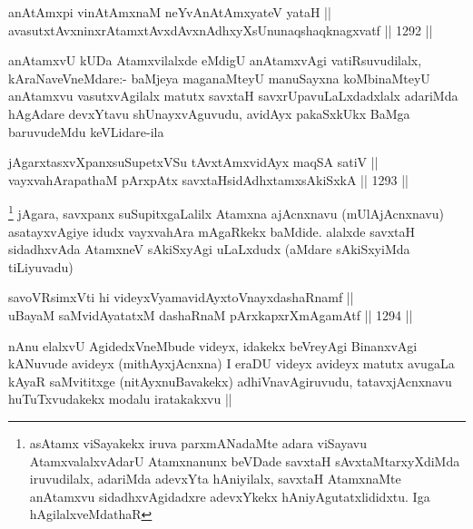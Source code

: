 
\begin{shl}
anAtAmx\s pi vinA\s \s tAmxnaM neYvAnAtAmxyateV yataH || \\
avasutxtAvxninxrAtamxtAvxdAvxnAdhxyXsUnunaqshaqknagxvatf ||  1292 ||  
\end{shl}

\begin{artha}
anAtamxvU kUDa Atamxvilalxde eMdigU anAtamxvAgi vatiRsuvudilalx, kAraNaveVneMdare:- baMjeya maganaMteyU manuSayxna koMbinaMteyU anAtamxvu vasutxvAgilalx matutx savxtaH savxrUpavuLaLxdadxlalx adariMda hAgAdare devxYtavu shUnayxvAguvudu, avidAyx pakaSxkUkx BaMga baruvudeMdu keVLidare-ila
\end{artha}


\begin{shl}
jAgarxtasxvXpanxsuSupetxVSu tAvxtAmxvidAyx maqSA satiV || \\
vayxvahArapathaM pArxpAtx savxtaHsidAdhxtamxsAkiSxkA ||  1293 ||  
\end{shl}

\begin{artha}
\footnote{asAtamx viSayakekx iruva parxmANadaMte adara viSayavu AtamxvalalxvAdarU Atamxnanunx beVDade savxtaH sAvxtaMtarxyXdiMda iruvudilalx, adariMda adevxYta hAniyilalx, savxtaH AtamxnaMte anAtamxvu sidadhxvAgidadxre adevxYkekx hAniyAgutatxlididxtu. Iga hAgilalxveMdathaR}
jAgara, savxpanx suSupitxgaLalilx Atamxna ajAcnxnavu (mUlAjAcnxnavu) asatayxvAgiye idudx vayxvahAra mAgaRkekx baMdide. alalxde savxtaH sidadhxvAda AtamxneV sAkiSxyAgi uLaLxdudx (aMdare sAkiSxyiMda tiLiyuvadu) 
\end{artha}


\begin{shl}
savoVR\s simxVti hi videyxVyamavidAyx\s toV\s nayxdashaRnamf ||  \\
uBayaM saMvidAyatatxM dashaRnaM pArxkapxrXmAgamAtf ||  1294 ||  
\end{shl}

\begin{artha}
nAnu elalxvU AgidedxVneMbude videyx, idakekx beVreyAgi BinanxvAgi kANuvude avideyx (mithAyxjAcnxna) I eraDU videyx avideyx matutx avugaLa kAyaR saMvititxge (nitAyxnuBavakekx) adhiVnavAgiruvudu, tatavxjAcnxnavu huTuTxvudakekx modalu iratakakxvu ||
\end{artha}

